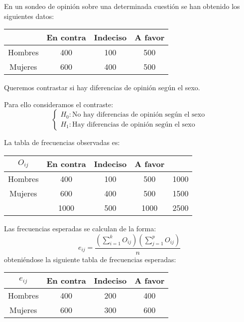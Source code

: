 \begin{exercise}
    En un sondeo de opinión sobre una determinada cuestión se han obtenido los siguientes datos:
    \begin{center}
        \begin{tabular}{| c | c c c |}
            \hline
                    & En contra & Indeciso & A favor \\
            \hline
            Hombres & 400       & 100      & 500     \\
            Mujeres & 600       & 400      & 500     \\
            \hline
        \end{tabular}
    \end{center}
    Queremos contrastar si hay diferencias de opinión según el sexo.

    Para ello consideramos el contraste:
    $$\begin{cases}
            H_0: \text{No hay diferencias de opinión según el sexo} \\
            H_1: \text{Hay diferencias de opinión según el sexo}
        \end{cases}$$

    La tabla de frecuencias observadas es:
    \begin{center}
        \begin{tabular}{| c | c c c | c |}
            \hline
            $O_{ij}$ & En contra & Indeciso & A favor &      \\
            \hline
            Hombres  & 400       & 100      & 500     & 1000 \\
            Mujeres  & 600       & 400      & 500     & 1500 \\
            \hline
                     & 1000      & 500      & 1000    & 2500 \\
            \hline
        \end{tabular}
    \end{center}

    Las frecuencias esperadas se calculan de la forma:
    $$e_{ij} = \frac{(\sum_{i=1}^k O_{ij})(\sum_{j=1}^p O_{ij})}{n}$$
    obteniéndose la siguiente tabla de frecuencias esperadas:

    \begin{center}
        \begin{tabular}{| c | c c c |}
            \hline
            $e_{ij}$ & En contra & Indeciso & A favor \\
            \hline
            Hombres  & 400       & 200      & 400     \\
            Mujeres  & 600       & 300      & 600     \\
            \hline
        \end{tabular}
    \end{center}


\end{exercise}
